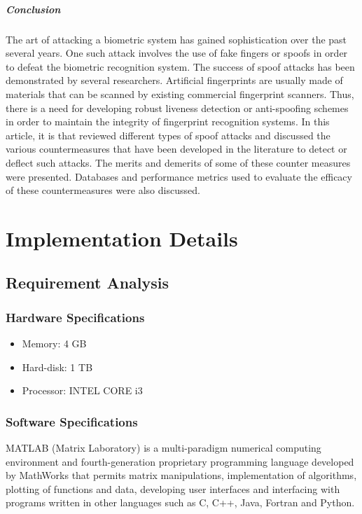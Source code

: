 \paragraph{\textbf{Conclusion}}
The art of attacking a biometric system has gained sophistication over the past several years. One such attack involves the use of fake fingers or spoofs in order to defeat the biometric recognition system. The success of spoof attacks has been demonstrated by several researchers. Artificial fingerprints are usually made of materials that can be scanned by existing commercial fingerprint scanners. Thus, there is a need for developing robust liveness detection or anti-spoofing schemes in order to maintain the integrity of fingerprint recognition systems. In this article, it is that reviewed different types of spoof attacks and discussed the various countermeasures that have been developed in the literature to detect or deflect such attacks. The merits and demerits of some of these counter measures were presented. Databases and performance metrics used to evaluate the efficacy of these countermeasures were also discussed. 



\chapter{Implementation Details}
\section{Requirement Analysis}
\subsection{Hardware Specifications}
\begin{itemize}
\item Memory: 4 GB
\item Hard-disk: 1 TB
\item Processor: INTEL CORE i3
\end{itemize}

\subsection{Software Specifications}
MATLAB (Matrix Laboratory) \cite{15} is a multi-paradigm numerical computing environment and fourth-generation proprietary programming language developed by MathWorks that permits matrix manipulations, implementation of algorithms, plotting of functions and data, developing user interfaces and interfacing with programs written in other languages such as C, C++, Java, Fortran and Python.

